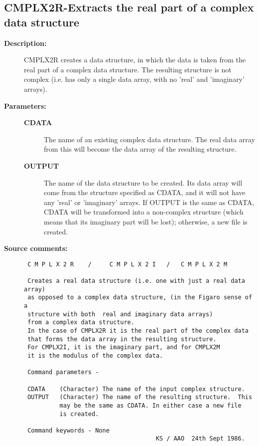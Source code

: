 \subsection{CMPLX2R-\label{CMPLX2R}Extracts the real part of a complex data structure}
\begin{description}

\item [{\bf Description:}]
 CMPLX2R creates a data structure, in which the data is taken
 from the real part of a complex data structure.  The resulting
 structure is not complex (i.e. has only a single data array, with
 no 'real' and 'imaginary' arrays).

\item [{\bf Parameters:}]
\begin{description}
\item [{\bf CDATA}]
 The name of an existing complex data structure.
 The real data array from this will become the data array
 of the resulting structure.
\item [{\bf OUTPUT}]
 The name of the data structure to be created.
 Its data array will come from the structure specified as
 CDATA, and it will not have any 'real' or 'imaginary'
 arrays.  If OUTPUT is the same as CDATA, CDATA will be
 transformed into a non-complex structure (which means
 that its imaginary part will be lost); otherwise, a new
 file is created.
\end{description}

\item [{\bf Source comments:}]
\begin{verbatim}
 C M P L X 2 R    /     C M P L X 2 I   /   C M P L X 2 M

 Creates a real data structure (i.e. one with just a real data array)
 as opposed to a complex data structure, (in the Figaro sense of a
 structure with both  real and imaginary data arrays)
 from a complex data structure.
 In the case of CMPLX2R it is the real part of the complex data
 that forms the data array in the resulting structure.
 For CMPLX2I, it is the imaginary part, and for CMPLX2M
 it is the modulus of the complex data.

 Command parameters -

 CDATA    (Character) The name of the input complex structure.
 OUTPUT   (Character) The name of the resulting structure.  This
          may be the same as CDATA. In either case a new file
          is created.

 Command keywords - None
                                     KS / AAO  24th Sept 1986.
\end{verbatim}
\end{description}
